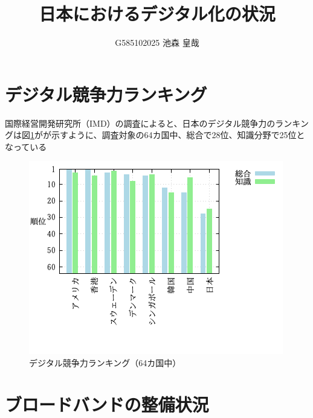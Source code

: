 \documentclass[a4paper,11pt,dvipdfmx]{ujarticle}
\title{日本におけるデジタル化の状況}
\author{G585102025 池森 皇哉}
\begin{document}
\maketitle %

\section{デジタル競争力ランキング}
国際経営開発研究所（IMD）の調査\cite{imd}によると、日本のデジタル競争力のランキングは図\ref{fig:ランキング}がが示すように、調査対象の64カ国中、総合で28位、知識分野で25位となっている
\begin{figure}[htbp]
    \centering
    \includegraphics[width=0.7\linewidth]{fig31.png}
    \caption{デジタル競争力ランキング（64カ国中）}\label{fig:ランキング}
\end{figure}


\section{ブロードバンドの整備状況}
\end{document}
